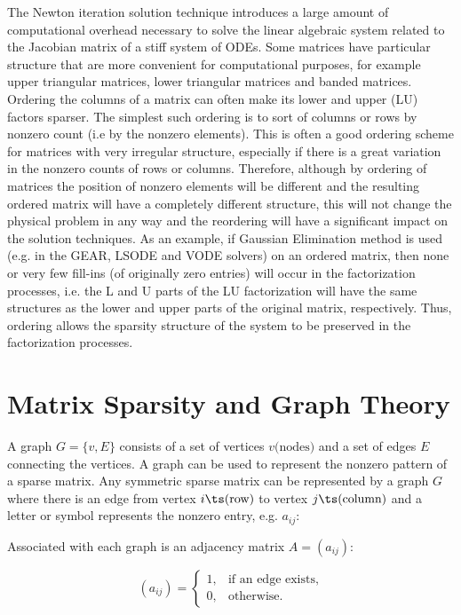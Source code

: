 The Newton iteration solution technique introduces a large amount of
computational overhead necessary to solve the linear algebraic system related to
the Jacobian matrix of a stiff system of ODEs. Some matrices have particular
structure that are more convenient for computational purposes, for example upper
triangular matrices, lower triangular matrices and banded matrices.  Ordering
the columns of a matrix can often make its lower and upper (LU) factors sparser.
The simplest such ordering is to sort of columns or rows by nonzero count (i.e
by the nonzero elements).  This is often a good ordering scheme for matrices
with very irregular structure, especially if there is a great variation in the
nonzero counts of rows or columns. Therefore, although by ordering of matrices
the position of nonzero elements will be different and the resulting ordered
matrix will have a completely different structure, this will not change the
physical problem in any way and the reordering will have a significant impact on
the solution techniques. As an example, if Gaussian Elimination method is used
(e.g. in the GEAR, LSODE and VODE solvers) on an ordered matrix, then none or
very few fill-ins (of originally zero entries) will occur in the factorization
processes, i.e. the L and U parts of the LU factorization will have the same
structures as the lower and upper parts of the original matrix, respectively.
Thus, ordering allows the sparsity structure of the system to be preserved in
the factorization processes.

\newpage
\section{Matrix Sparsity and Graph Theory}

A graph $G = \{v,E\}$ consists of a set of vertices $v\text{(nodes)}$ and a
set of edges $E$ connecting the vertices.  A graph can be used to represent the
nonzero pattern of a sparse matrix.  Any symmetric sparse matrix can be
represented by a graph $G$ where there is an edge from vertex
$i\ts\text{(row)}$ to vertex $j\ts\text{(column)}$ and a letter or symbol
represents the nonzero entry, e.g. $a_{ij}$:

Associated with each graph is an adjacency matrix $A = (a_{ij})$:

\begin{equation*}
    (a_{ij})=\begin{cases}
        1, & \text{if an edge exists},\\
        0, & \text{otherwise}.
    \end{cases}
\end{equation*}

